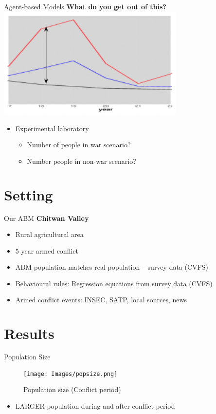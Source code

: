 \documentclass{beamer}
\begin{document}
		\begin{frame}{Agent-based Models}
			\textbf{What do you get out of this?}
			\includegraphics[width=0.7\textwidth]{Images/method3.png}

			\begin{itemize}
				\item Experimental laboratory
					\begin{itemize}
						\item Number of people in war scenario?
						\item Number people in non-war scenario?
					\end{itemize}
			\end{itemize}
		\end{frame}

	\section{Setting}
		\begin{frame}{Our ABM}
			\textbf{Chitwan Valley}
			
			\begin{itemize}
				\item Rural agricultural area
				\item 5 year armed conflict 
				\item ABM population matches real population -- survey data (CVFS)
				\item Behavioural rules: Regression equations from survey data (CVFS)
				\item Armed conflict events: INSEC, SATP, local sources, news 
			\end{itemize}
		\end{frame}

	\section{Results}
		\begin{frame}{Population Size}
			\begin{center}
				\begin{figure}
					\texttt{[image: Images/popsize.png]}
					\caption{Population size (Conflict period)}
				\end{figure}
			\end{center} 	

			\begin{itemize}
				\item LARGER population during and after conflict period
			\end{itemize}
		\end{frame}
\end{document}

